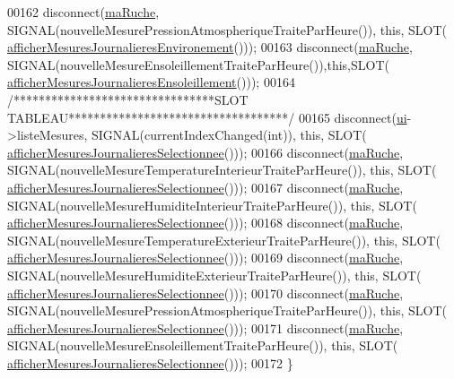 \begin{DoxyCode}
00162     disconnect(\hyperlink{class_ruche_ihm_a43a6b1fa31f4fba58d919daae3707b38}{maRuche}, SIGNAL(nouvelleMesurePressionAtmospheriqueTraiteParHeure()), \textcolor{keyword}{this}, SLOT(
      \hyperlink{class_ruche_ihm_a5ee5942435915ca134765f42ff4b9061}{afficherMesuresJournalieresEnvironement}()));
00163     disconnect(\hyperlink{class_ruche_ihm_a43a6b1fa31f4fba58d919daae3707b38}{maRuche}, SIGNAL(nouvelleMesureEnsoleillementTraiteParHeure()),\textcolor{keyword}{this},SLOT(
      \hyperlink{class_ruche_ihm_abc250d15e6782c522b3d6676e0ee032d}{afficherMesuresJournalieresEnsoleillement}()));
00164     \textcolor{comment}{/********************************SLOT TABLEAU***********************************/}
00165     disconnect(\hyperlink{class_ruche_ihm_a64786058bd7f88ca2f1e9743bb27c25b}{ui}->listeMesures, SIGNAL(currentIndexChanged(\textcolor{keywordtype}{int})), \textcolor{keyword}{this}, SLOT(
      \hyperlink{class_ruche_ihm_a7f66af552d9e7ba0d00437ff3b330706}{afficherMesuresJournalieresSelectionnee}()));
00166     disconnect(\hyperlink{class_ruche_ihm_a43a6b1fa31f4fba58d919daae3707b38}{maRuche}, SIGNAL(nouvelleMesureTemperatureInterieurTraiteParHeure()), \textcolor{keyword}{this}, SLOT(
      \hyperlink{class_ruche_ihm_a7f66af552d9e7ba0d00437ff3b330706}{afficherMesuresJournalieresSelectionnee}()));
00167     disconnect(\hyperlink{class_ruche_ihm_a43a6b1fa31f4fba58d919daae3707b38}{maRuche}, SIGNAL(nouvelleMesureHumiditeInterieurTraiteParHeure()), \textcolor{keyword}{this}, SLOT(
      \hyperlink{class_ruche_ihm_a7f66af552d9e7ba0d00437ff3b330706}{afficherMesuresJournalieresSelectionnee}()));
00168     disconnect(\hyperlink{class_ruche_ihm_a43a6b1fa31f4fba58d919daae3707b38}{maRuche}, SIGNAL(nouvelleMesureTemperatureExterieurTraiteParHeure()), \textcolor{keyword}{this}, SLOT(
      \hyperlink{class_ruche_ihm_a7f66af552d9e7ba0d00437ff3b330706}{afficherMesuresJournalieresSelectionnee}()));
00169     disconnect(\hyperlink{class_ruche_ihm_a43a6b1fa31f4fba58d919daae3707b38}{maRuche}, SIGNAL(nouvelleMesureHumiditeExterieurTraiteParHeure()), \textcolor{keyword}{this}, SLOT(
      \hyperlink{class_ruche_ihm_a7f66af552d9e7ba0d00437ff3b330706}{afficherMesuresJournalieresSelectionnee}()));
00170     disconnect(\hyperlink{class_ruche_ihm_a43a6b1fa31f4fba58d919daae3707b38}{maRuche}, SIGNAL(nouvelleMesurePressionAtmospheriqueTraiteParHeure()), \textcolor{keyword}{this}, SLOT(
      \hyperlink{class_ruche_ihm_a7f66af552d9e7ba0d00437ff3b330706}{afficherMesuresJournalieresSelectionnee}()));
00171     disconnect(\hyperlink{class_ruche_ihm_a43a6b1fa31f4fba58d919daae3707b38}{maRuche}, SIGNAL(nouvelleMesureEnsoleillementTraiteParHeure()), \textcolor{keyword}{this}, SLOT(
      \hyperlink{class_ruche_ihm_a7f66af552d9e7ba0d00437ff3b330706}{afficherMesuresJournalieresSelectionnee}()));
00172 \}
\end{DoxyCode}
\mbox{\label{class_ruche_ihm_a386868ba4e6e37b9d877fe3ab330e605}} 
